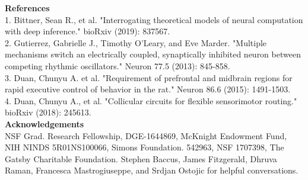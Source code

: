 \documentclass[landscape]{article}
\begin{document}
\begin{minipage}[c]{0.29\linewidth}
{\bf\LARGE References} \\
\large
1. Bittner, Sean R., et al. "Interrogating theoretical models of neural computation with deep inference." bioRxiv (2019): 837567. \\
2. Gutierrez, Gabrielle J., Timothy O’Leary, and Eve Marder. "Multiple mechanisms switch an electrically coupled, synaptically inhibited neuron between competing rhythmic oscillators." Neuron 77.5 (2013): 845-858.  \\
3. Duan, Chunyu A. et al. "Requirement of prefrontal and midbrain regions for rapid executive control of behavior in the rat." Neuron 86.6 (2015): 1491-1503.\\
4. Duan, Chunyu A., et al. "Collicular circuits for flexible sensorimotor routing." bioRxiv (2018): 245613. \\
{\bf\large Acknowledgements} \\
\large
NSF Grad. Research Fellowship,  DGE-1644869, McKnight Endowment Fund, NIH NINDS 5R01NS100066, Simons Foundation. 542963, NSF 1707398, The Gatsby Charitable Foundation. Stephen Baccus, James Fitzgerald, Dhruva Raman, Francesca Mastrogiuseppe, and Srdjan Ostojic for helpful conversations. \\
\end{minipage}
\end{document}
